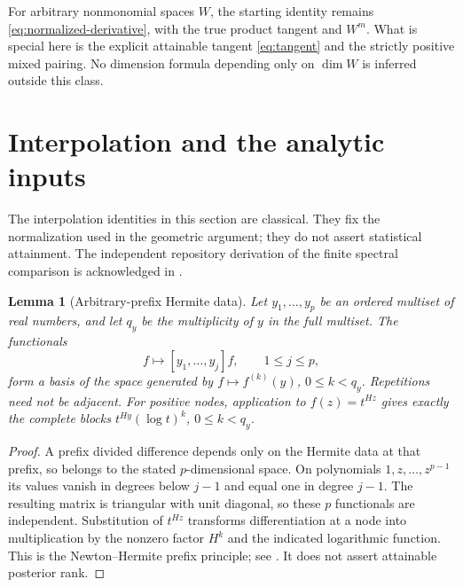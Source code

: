 \documentclass[11pt]{amsart}
\newtheorem{lemma}[theorem]{Lemma}
\theoremstyle{definition}\newtheorem{definition}[theorem]{Definition}
\theoremstyle{remark}\newtheorem{remark}[theorem]{Remark}
\begin{document}
For arbitrary nonmonomial spaces $W$, the starting identity remains
\eqref{eq:normalized-derivative}, with the true product tangent and
$W^m$. What is special here is the explicit attainable tangent
\eqref{eq:tangent} and the strictly positive mixed pairing. No dimension
formula depending only on $\dim W$ is inferred outside this class.

\section{Interpolation and the analytic inputs}\label{sec:classical}
The interpolation identities in this section are classical. They fix the
normalization used in the geometric argument; they do not assert
statistical attainment. The independent repository derivation of the
finite spectral comparison is acknowledged in \cite{A1v9note}.

\begin{lemma}[Arbitrary-prefix Hermite data]\label{lem:prefix-hermite}
Let $y_1,\ldots,y_p$ be an ordered multiset of real numbers, and let
$q_y$ be the multiplicity of $y$ in the full multiset. The functionals
\[
 f\longmapsto[y_1,\ldots,y_j]f,\qquad 1\le j\le p,
\]
form a basis of the space generated by
$f\mapsto f^{(k)}(y)$, $0\le k<q_y$. Repetitions need not be adjacent.
For positive nodes, application to $f(z)=t^{Hz}$ gives exactly the
complete blocks $t^{Hy}(\log t)^k$, $0\le k<q_y$.
\end{lemma}
\begin{proof}
A prefix divided difference depends only on the Hermite data at that
prefix, so belongs to the stated $p$-dimensional space. On polynomials
$1,z,\ldots,z^{p-1}$ its values vanish in degrees below $j-1$ and
equal one in degree $j-1$. The resulting matrix is triangular with
unit diagonal, so these $p$ functionals are independent. Substitution
of $t^{Hz}$ transforms differentiation at a node into multiplication
by the nonzero factor $H^k$ and the indicated logarithmic function.
This is the Newton--Hermite prefix principle; see
\cite[Proposition 7]{deBoor}. It does not assert attainable posterior rank.
\end{proof}
\end{document}
